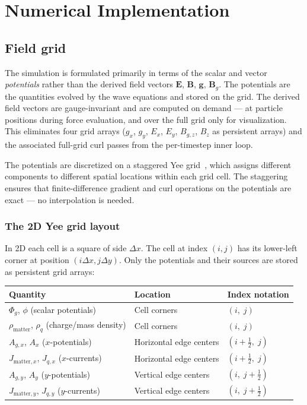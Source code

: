 \documentclass[11pt,a4paper]{article}
\newcommand{\vv}[1]{\mathbf{#1}}
\newcommand{\Phig}{\Phi_g}
\begin{document}
\section{Numerical Implementation}
\label{sec:numerical}

\subsection{Field grid}

The simulation is formulated primarily in terms of the scalar and vector \emph{potentials} rather than the derived field vectors $\vv{E}$, $\vv{B}$, $\vv{g}$, $\vv{B}_g$.  The potentials are the quantities evolved by the wave equations and stored on the grid.  The derived field vectors are gauge-invariant and are computed on demand --- at particle positions during force evaluation, and over the full grid only for visualization.  This eliminates four grid arrays ($g_x$, $g_y$, $E_x$, $E_y$, $B_{g,z}$, $B_z$ as persistent arrays) and the associated full-grid curl passes from the per-timestep inner loop.

The potentials are discretized on a staggered Yee grid~\cite{Yee1966,TafloveHagness2005}, which assigns different components to different spatial locations within each grid cell.  The staggering ensures that finite-difference gradient and curl operations on the potentials are exact --- no interpolation is needed.

\subsubsection*{The 2D Yee grid layout}

In 2D each cell is a square of side $\Delta x$.  The cell at index $(i,j)$ has its lower-left corner at position $(i\Delta x, j\Delta y)$.  Only the potentials and their sources are stored as persistent grid arrays:

\begin{center}
\begin{tabular}{@{}L{5cm}L{3cm}L{5cm}@{}}
\toprule
\textbf{Quantity} & \textbf{Location} & \textbf{Index notation} \\
\midrule
$\Phig$, $\phi$ (scalar potentials) & Cell corners & $(i,\; j)$ \\
$\rho_{\mathrm{matter}}$, $\rho_q$ (charge/mass density) & Cell corners & $(i,\; j)$ \\
$A_{g,x}$, $A_x$ ($x$-potentials) & Horizontal edge centers & $(i+\tfrac{1}{2},\; j)$ \\
$J_{\mathrm{matter},x}$, $J_{q,x}$ ($x$-currents) & Horizontal edge centers & $(i+\tfrac{1}{2},\; j)$ \\
$A_{g,y}$, $A_y$ ($y$-potentials) & Vertical edge centers & $(i,\; j+\tfrac{1}{2})$ \\
$J_{\mathrm{matter},y}$, $J_{q,y}$ ($y$-currents) & Vertical edge centers & $(i,\; j+\tfrac{1}{2})$ \\
\bottomrule
\end{tabular}
\end{center}
\end{document}
